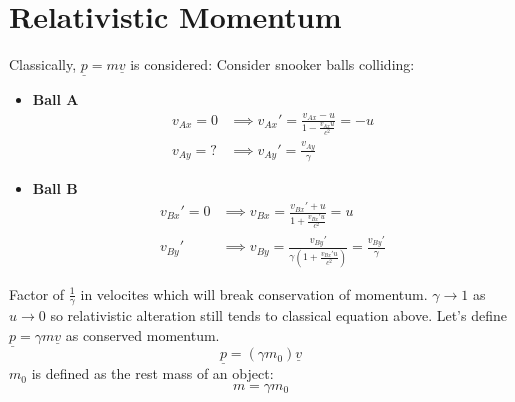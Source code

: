 \documentclass[a4paper, 11pt, normalem]{report}
\begin{document}
\section{Relativistic Momentum}
Classically, $\underline{p} = m\underline{v}$ is considered:
Consider snooker balls colliding:
\begin{itemize}
    \item \textbf{Ball A}
        \begin{align}
            v_{Ax} = 0 &\implies v_{Ax}' = \frac{v_{Ax} - u}{1 - \tfrac{v_{Ax}u}{c^{2}}} = -u \\
            v_{Ay} = ? &\implies v_{Ay}' = \frac{v_{Ay}}{\gamma}
        \end{align}
    \item \textbf{Ball B}
        \begin{align}
            v_{Bx}' = 0 &\implies v_{Bx} = \frac{v_{Bx}' + u}{1 + \tfrac{v_{Bx}'u}{c^{2}}} = u \\
            v_{By}' &\implies v_{By} = \frac{v_{By}'}{\gamma(1 + \tfrac{v_{Bx}'u}{c^{2}})} = \frac{v_{By}'}{\gamma}
        \end{align}
\end{itemize}
Factor of $\frac{1}{\gamma}$ in velocites which will break conservation of momentum.
$\gamma \rightarrow 1$ as $u \rightarrow 0$ so relativistic alteration still tends to classical equation above.
Let's define $\underline{p} = \gamma m\underline{v}$ as conserved momentum.
\begin{equation}
    \underline{p} = (\gamma m_{0})\underline{v}
\end{equation}
$m_{0}$ is defined as the rest mass of an object:
\begin{equation}
    m = \gamma m_{0}
\end{equation}
\end{document}

